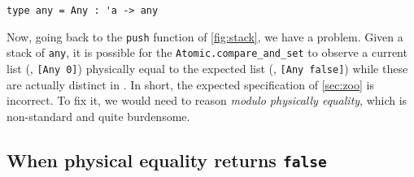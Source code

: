 \begin{verbatim}
type any = Any : 'a -> any
\end{verbatim}

Now, going back to the \texttt{push} function of \cref{fig:stack}, we have a problem.
Given a stack of \texttt{any}, it is possible for the \texttt{Atomic.compare_and_set} to observe a current list (\eg, \texttt{[Any 0]}) physically equal to the expected list (\eg, \texttt{[Any false]}) while these are actually distinct in \Rocq.
In short, the expected specification of \cref{sec:zoo} is incorrect.
To fix it, we would need to reason \emph{modulo physically equality}, which is non-standard and quite burdensome.

\subsection{When physical equality returns \texttt{false}}


%
%
%


